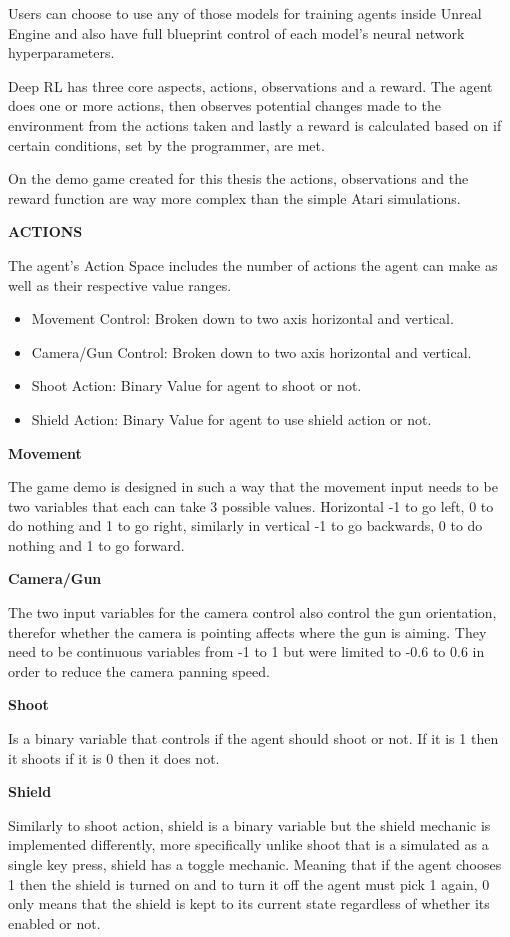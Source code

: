 \documentclass[a4paper,one side,12pt]{book}
\begin{document}
Users can choose to use any of those models for training agents inside
Unreal Engine and also have full blueprint control of each model's
neural network hyperparameters.

Deep RL has three core aspects, actions, observations and a reward. The agent does one or more actions, then observes potential changes made to the environment from the actions taken and lastly a reward is calculated based on if certain conditions, set by the programmer, are met.

On the demo game created for this thesis the actions, observations and
the reward function are way more complex than the simple Atari
simulations.

\textbf{ACTIONS}

The agent's Action Space includes the number of actions the agent can
make as well as their respective value ranges.

\begin{itemize}
\item
  Movement Control: Broken down to two axis horizontal and vertical.
\item
  Camera/Gun Control: Broken down to two axis horizontal and vertical.
\item
  Shoot Action: Binary Value for agent to shoot or not.
\item
  Shield Action: Binary Value for agent to use shield action or not.
\end{itemize}

\textbf{Movement}

The game demo is designed in such a way that the movement input needs to
be two variables that each can take 3 possible values. Horizontal -1 to
go left, 0 to do nothing and 1 to go right, similarly in vertical -1 to
go backwards, 0 to do nothing and 1 to go forward.

\textbf{Camera/Gun}

The two input variables for the camera control also control the gun
orientation, therefor whether the camera is pointing affects where the
gun is aiming. They need to be continuous variables from -1 to 1 but
were limited to -0.6 to 0.6 in order to reduce the camera panning speed.

\textbf{Shoot}

Is a binary variable that controls if the agent should shoot or not. If
it is 1 then it shoots if it is 0 then it does not.

\textbf{Shield}

Similarly to shoot action, shield is a binary variable but the shield
mechanic is implemented differently, more specifically unlike shoot that
is a simulated as a single key press, shield has a toggle mechanic.
Meaning that if the agent chooses 1 then the shield is turned on and to
turn it off the agent must pick 1 again, 0 only means that the shield is
kept to its current state regardless of whether its enabled or not.
\end{document}

